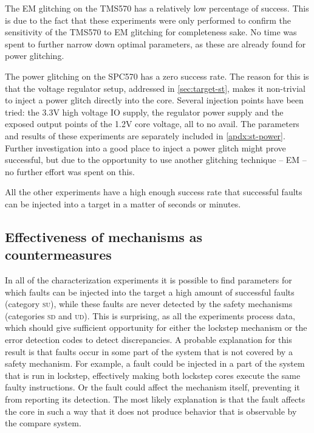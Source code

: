 \documentclass[10pt]{article}
\newcommand{\TI}{TMS570\xspace}
\newcommand{\ST}{SPC570\xspace}
\newcommand{\UD}{\textsc{ud}\xspace}
\newcommand{\SU}{\textsc{su}\xspace}
\newcommand{\SD}{\textsc{sd}\xspace}
\begin{document}
    The EM glitching on the \TI has a relatively low percentage of success. This is due to the fact that these experiments were only performed to confirm the sensitivity of the \TI to EM glitching for completeness sake. No time was spent to further narrow down optimal parameters, as these are already found for power glitching. 

    The power glitching on the \ST has a zero success rate. The reason for this is that the voltage regulator setup, addressed in \autoref{sec:target-st}, makes it non-trivial to inject a power glitch directly into the core. Several injection points have been tried: the 3.3V high voltage IO supply, the regulator power supply and the exposed output points of the 1.2V core voltage, all to no avail. The parameters and results of these experiments are separately included in \autoref{apdx:st-power}. Further investigation into a good place to inject a power glitch might prove successful, but due to the opportunity to use another glitching technique -- EM -- no further effort was spent on this.

    All the other experiments have a high enough success rate that successful faults can be injected into a target in a matter of seconds or minutes.


  \subsection{Effectiveness of mechanisms as countermeasures}
  \label{sec:effectiveness-countermeasures}

    In all of the characterization experiments it is possible to find parameters for which faults can be injected into the target a high amount of successful faults (category \SU), while these faults are never detected by the safety mechanisms (categories \SD and \UD). This is surprising, as all the experiments process data, which should give sufficient opportunity for either the lockstep mechanism or the error detection codes to detect discrepancies. A probable explanation for this result is that faults occur in some part of the system that is not covered by a safety mechanism. For example, a fault could be injected in a part of the system that is run in lockstep, effectively making both lockstep cores execute the same faulty instructions. Or the fault could affect the mechanism itself, preventing it from reporting its detection. The most likely explanation is that the fault affects the core in such a way that it does not produce behavior that is observable by the compare system.
\end{document}
